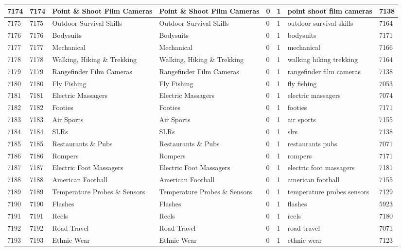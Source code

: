 \begin{longtable}{|l|l|l|l|l|l|l|l|}
7174 & 7174 & Point \& Shoot Film Cameras & Point \& Shoot Film Cameras & 0 & 1 & point shoot film cameras & 7138 \\ \hline 
7175 & 7175 & Outdoor Survival Skills & Outdoor Survival Skills & 0 & 1 & outdoor survival skills & 7164 \\ \hline 
7176 & 7176 & Bodysuits & Bodysuits & 0 & 1 & bodysuits & 7171 \\ \hline 
7177 & 7177 & Mechanical & Mechanical & 0 & 1 & mechanical & 7166 \\ \hline 
7178 & 7178 & Walking, Hiking \& Trekking & Walking, Hiking \& Trekking & 0 & 1 & walking hiking trekking & 7164 \\ \hline 
7179 & 7179 & Rangefinder Film Cameras & Rangefinder Film Cameras & 0 & 1 & rangefinder film cameras & 7138 \\ \hline 
7180 & 7180 & Fly Fishing & Fly Fishing & 0 & 1 & fly fishing & 7053 \\ \hline 
7181 & 7181 & Electric Massagers & Electric Massagers & 0 & 1 & electric massagers & 7074 \\ \hline 
7182 & 7182 & Footies & Footies & 0 & 1 & footies & 7171 \\ \hline 
7183 & 7183 & Air Sports & Air Sports & 0 & 1 & air sports & 7155 \\ \hline 
7184 & 7184 & SLRs & SLRs & 0 & 1 & slrs & 7138 \\ \hline 
7185 & 7185 & Restaurants \& Pubs & Restaurants \& Pubs & 0 & 1 & restaurants pubs & 7071 \\ \hline 
7186 & 7186 & Rompers & Rompers & 0 & 1 & rompers & 7171 \\ \hline 
7187 & 7187 & Electric Foot Massagers & Electric Foot Massagers & 0 & 1 & electric foot massagers & 7181 \\ \hline 
7188 & 7188 & American Football & American Football & 0 & 1 & american football & 7155 \\ \hline 
7189 & 7189 & Temperature Probes \& Sensors & Temperature Probes \& Sensors & 0 & 1 & temperature probes sensors & 7129 \\ \hline 
7190 & 7190 & Flashes & Flashes & 0 & 1 & flashes & 5923 \\ \hline 
7191 & 7191 & Reels & Reels & 0 & 1 & reels & 7180 \\ \hline 
7192 & 7192 & Road Travel & Road Travel & 0 & 1 & road travel & 7071 \\ \hline 
7193 & 7193 & Ethnic Wear & Ethnic Wear & 0 & 1 & ethnic wear & 7123 \\ \hline 

\end{longtable}
